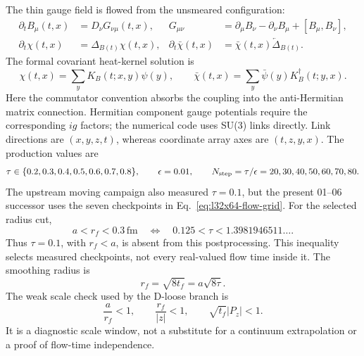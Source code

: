 \documentclass[11pt]{article}
\numberwithin{equation}{section}
\begin{document}
The thin gauge field is flowed from the unsmeared configuration:
\begin{align}
 \partial_t B_\mu(t,x)&=D_\nu G_{\nu\mu}(t,x),&
 G_{\mu\nu}&=\partial_\mu B_\nu-\partial_\nu B_\mu+[B_\mu,B_\nu],
 \label{eq:l32x64-gauge-flow}\\
 \partial_t\chi(t,x)&=\Delta_{B(t)}\chi(t,x),&
 \partial_t\bar\chi(t,x)&=\bar\chi(t,x)\overleftarrow{\Delta}_{B(t)}.
 \label{eq:l32x64-fermion-flow}
\end{align}
The formal covariant heat-kernel solution is
\begin{equation}
 \chi(t,x)=\sum_y K_B(t;x,y)\psi(y),\qquad
 \bar\chi(t,x)=\sum_y\bar\psi(y)K_B^\dagger(t;y,x).
\label{eq:l32x64-kernel}
\end{equation}
Here the commutator convention absorbs the coupling into the
anti-Hermitian matrix connection.  Hermitian component gauge potentials
require the corresponding \(ig\) factors; the numerical code uses SU(3)
links directly.  Link directions are \((x,y,z,t)\), whereas coordinate
array axes are \((t,z,y,x)\).
The production values are
\begin{equation}
 \tau\in\{0.2,0.3,0.4,0.5,0.6,0.7,0.8\},\qquad
 \epsilon=0.01,\qquad
 N_{\rm step}=\tau/\epsilon=20,30,40,50,60,70,80.
\label{eq:l32x64-flow-grid}
\end{equation}
The upstream moving campaign also measured \(\tau=0.1\), but the present
01--06 successor uses the seven checkpoints in
Eq.~\eqref{eq:l32x64-flow-grid}.  For the selected radius cut,
\begin{equation}
 a<r_f<0.3\,\mathrm{fm}
 \quad\Longleftrightarrow\quad
 0.125<\tau<1.3981946511\ldots .
\label{eq:l32x64-radius-window}
\end{equation}
Thus \(\tau=0.1\), with \(r_f<a\), is absent from this postprocessing.
This inequality selects measured checkpoints, not every real-valued
flow time inside it.
The smoothing radius is
\begin{equation}
 r_f=\sqrt{8t_f}=a\sqrt{8\tau}.
\label{eq:l32x64-flow-radius}
\end{equation}
The weak scale check used by the D-loose branch is
\begin{equation}
 \frac{a}{r_f}<1,\qquad \frac{r_f}{|z|}<1,\qquad
 \sqrt{t_f}|P_z|<1.
\label{eq:l32x64-weak-window}
\end{equation}
It is a diagnostic scale window, not a substitute for a continuum
extrapolation or a proof of flow-time independence.
\end{document}
